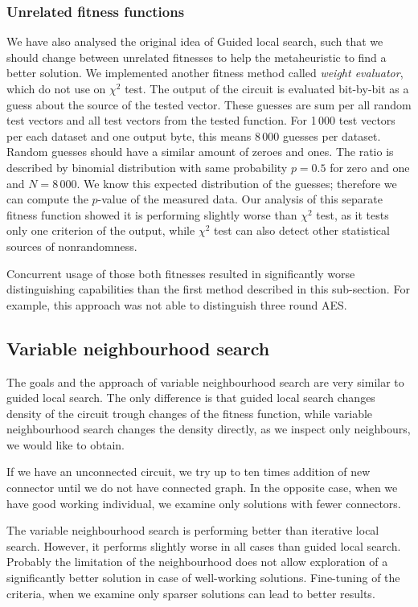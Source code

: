 \documentclass[
  print, %
  Table,   %
  nolof,     %
  nolot,     %
  11pt, %
  oneside  %
]{fithesis3}
\begin{document}
\subsubsection{Unrelated fitness functions}

We have also analysed the original idea of Guided local search, such that we should change between unrelated fitnesses to help the metaheuristic to find a better solution. We implemented another fitness method called \textit{weight evaluator}, which do not use on $\chi^{2}$ test. The output of the circuit is evaluated bit-by-bit as a guess about the source of the tested vector. These guesses are sum per all random test vectors and all test vectors from the tested function. For 1\,000 test vectors per each dataset and one output byte, this means 8\,000 guesses per dataset. Random guesses should have a similar amount of zeroes and ones. The ratio is described by binomial distribution with same probability $p = 0.5$ for zero and one and $N = 8\,000$. We know this expected distribution of the guesses; therefore we can compute the $p$-value of the measured data. Our analysis of this separate fitness function showed it is performing slightly worse than $\chi^{2}$ test, as it tests only one criterion of the output, while $\chi^{2}$ test can also detect other statistical sources of nonrandomness.

Concurrent usage of those both fitnesses resulted in significantly worse distinguishing capabilities than the first method described in this sub-section. For example, this approach was not able to distinguish three round AES.


\subsection{Variable neighbourhood search}
\label{subsec:res-ss-vns}

The goals and the approach of variable neighbourhood search are very similar to guided local search. The only difference is that guided local search changes density of the circuit trough changes of the fitness function, while variable neighbourhood search changes the density directly, as we inspect only neighbours, we would like to obtain.

If we have an unconnected circuit, we try up to ten times addition of new connector until we do not have connected graph. In the opposite case, when we have good working individual, we examine only solutions with fewer connectors.

The variable neighbourhood search is performing better than iterative local search. However, it performs slightly worse in all cases than guided local search. Probably the limitation of the neighbourhood does not allow exploration of a significantly better solution in case of well-working solutions. Fine-tuning of the criteria, when we examine only sparser solutions can lead to better results.
\end{document}
